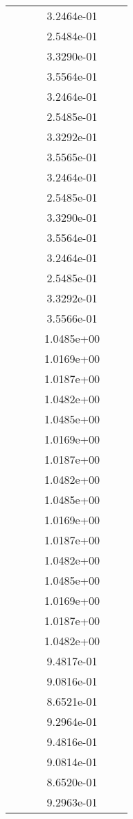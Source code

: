 \begin{xltabular}{\textwidth}{r|rS[table-format=1.3e+2]S[table-format=1.4e+2]S[table-format=1.4e+2]S[table-format=-1.5]}
&  &  & 3.2464e-01 & & \\
&  &  & 2.5484e-01 & & \\
&  &  & 3.3290e-01 & & \\
&  &  & 3.5564e-01 & & \\
&  &  & 3.2464e-01 & & \\
&  &  & 2.5485e-01 & & \\
&  &  & 3.3292e-01 & & \\
&  &  & 3.5565e-01 & & \\
&  &  & 3.2464e-01 & & \\
&  &  & 2.5485e-01 & & \\
&  &  & 3.3290e-01 & & \\
&  &  & 3.5564e-01 & & \\
&  &  & 3.2464e-01 & & \\
&  &  & 2.5485e-01 & & \\
&  &  & 3.3292e-01 & & \\
&  &  & 3.5566e-01 & & \\
&  &  & 1.0485e+00 & & \\
&  &  & 1.0169e+00 & & \\
&  &  & 1.0187e+00 & & \\
&  &  & 1.0482e+00 & & \\
&  &  & 1.0485e+00 & & \\
&  &  & 1.0169e+00 & & \\
&  &  & 1.0187e+00 & & \\
&  &  & 1.0482e+00 & & \\
&  &  & 1.0485e+00 & & \\
&  &  & 1.0169e+00 & & \\
&  &  & 1.0187e+00 & & \\
&  &  & 1.0482e+00 & & \\
&  &  & 1.0485e+00 & & \\
&  &  & 1.0169e+00 & & \\
&  &  & 1.0187e+00 & & \\
&  &  & 1.0482e+00 & & \\
&  &  & 9.4817e-01 & & \\
&  &  & 9.0816e-01 & & \\
&  &  & 8.6521e-01 & & \\
&  &  & 9.2964e-01 & & \\
&  &  & 9.4816e-01 & & \\
&  &  & 9.0814e-01 & & \\
&  &  & 8.6520e-01 & & \\
&  &  & 9.2963e-01 & & \\

\end{xltabular}
